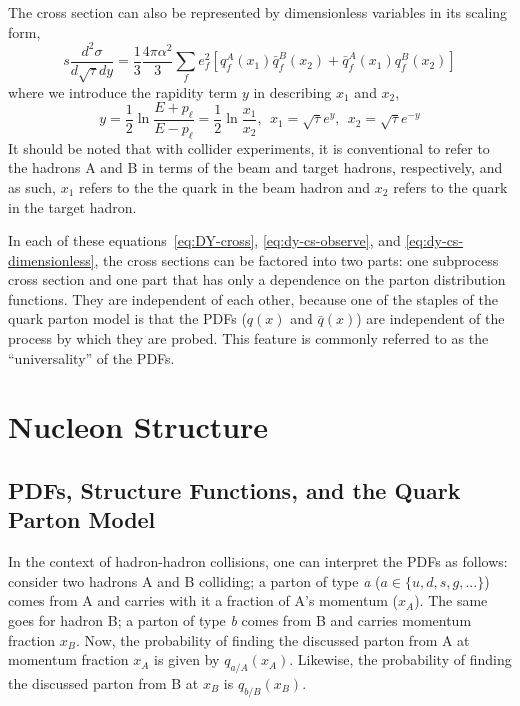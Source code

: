 The cross section can also be represented by dimensionless variables in its scaling form,
\begin{equation}
s \frac{d^2\sigma}{d \sqrt{\tau} dy} = 
\frac{1}{3}\frac{4\pi\alpha^2}{3}
\sum_{f}e_f^2[q_f^A(x_1)\bar{q}_f^B(x_2)+
\bar{q}_f^A(x_1)q_f^B(x_2)]
\label{eq:dy-cs-dimensionless}
\end{equation}
where we introduce the rapidity term $y$ in describing $x_1$ and $x_2$,
\begin{equation}
y  = \frac{1}{2} \ln \frac{E+ p_\ell}{E-p_\ell} = \frac{1}{2} \ln \frac{x_1}{x_2},\ \ 
x_1  = \sqrt{\tau} e^{y},\ \  
x_2  = \sqrt{\tau} e^{-y}
\end{equation}
It should be noted that with collider experiments, it is conventional to refer to the hadrons A and B in terms of the beam and target hadrons, respectively, and as such, $x_1$ refers to the the quark in the beam hadron and $x_2$ refers to the quark in the target hadron.

In each of these equations~\ref{eq:DY-cross}, \ref{eq:dy-cs-observe}, and \ref{eq:dy-cs-dimensionless}, the cross sections can be factored into two parts: one subprocess cross section and one part that has only a dependence on the parton distribution functions. They are independent of each other, because one of the staples of the quark parton model is that the PDFs ($q(x)$ and $\bar{q}(x)$) are independent of the process by which they are probed. This feature is commonly referred to as the ``universality'' of the PDFs.

\section{Nucleon Structure}

\subsection{PDFs, Structure Functions, and the Quark Parton Model}

In the context of hadron-hadron collisions, one can interpret the PDFs as follows: consider two hadrons A and B colliding; a parton of type \emph{a} ($a\in \{u, d, s, g, ...\}$) comes from A and carries with it a fraction of A's momentum ($x_A$).  The same goes for hadron B; a parton of type \emph{b} comes from B and carries momentum fraction $x_B$. Now, the probability of finding the discussed parton from A at momentum fraction $x_A$ is given by $q_{a/A}(x_A)$. Likewise, the probability of finding the discussed parton from B at $x_B$ is $q_{b/B}(x_B)$.

